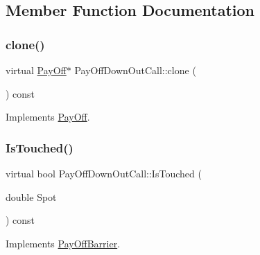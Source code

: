\subsection{Member Function Documentation}
\hypertarget{classPayOffDownOutCall_a3c52ed87e5ca563883a37f55ca99ecd1}{}\label{classPayOffDownOutCall_a3c52ed87e5ca563883a37f55ca99ecd1} 
\subsubsection{\texorpdfstring{clone()}{clone()}}
{\footnotesize\ttfamily virtual \hyperlink{classPayOff}{Pay\+Off}$\ast$ Pay\+Off\+Down\+Out\+Call\+::clone (\begin{DoxyParamCaption}{ }\end{DoxyParamCaption}) const\hspace{0.3cm}{\ttfamily [virtual]}}



Implements \hyperlink{classPayOff_ad8194d5b82247ae89c25c515f0ba806a}{Pay\+Off}.

\hypertarget{classPayOffDownOutCall_a516af0320ef04d315b66a924e346aa78}{}\label{classPayOffDownOutCall_a516af0320ef04d315b66a924e346aa78} 
\subsubsection{\texorpdfstring{Is\+Touched()}{IsTouched()}}
{\footnotesize\ttfamily virtual bool Pay\+Off\+Down\+Out\+Call\+::\+Is\+Touched (\begin{DoxyParamCaption}\item[{double}]{Spot }\end{DoxyParamCaption}) const\hspace{0.3cm}{\ttfamily [virtual]}}



Implements \hyperlink{classPayOffBarrier_a2aa9162c618c4f72a6593dc625e1e1e8}{Pay\+Off\+Barrier}.

\hypertarget{classPayOffDownOutCall_abbc1f3cb88555c9b01acac09b38832b1}{}\label{classPayOffDownOutCall_abbc1f3cb88555c9b01acac09b38832b1} 
